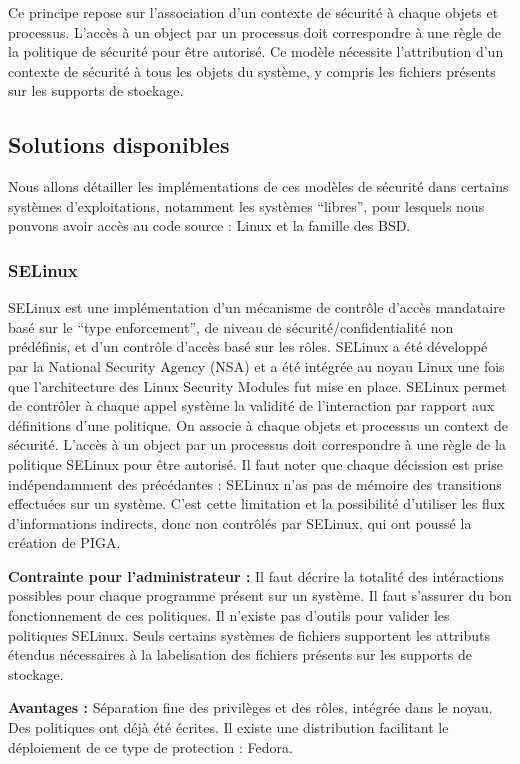 Ce principe repose sur l'association d'un contexte de sécurité à chaque objets et processus. L'accès à un object par un processus doit correspondre à une règle de la politique de sécurité pour être autorisé. Ce modèle nécessite l'attribution d'un contexte de sécurité à tous les objets du système, y compris les fichiers présents sur les supports de stockage.

\subsection{Solutions disponibles}

Nous allons détailler les implémentations de ces modèles de sécurité dans certains systèmes d'exploitations, notamment les systèmes ``libres'', pour lesquels nous pouvons avoir accès au code source : Linux et la famille des BSD.

\subsubsection{SELinux}

SELinux est une implémentation d'un mécanisme de contrôle d'accès mandataire basé sur le ``type enforcement'', de niveau de sécurité/confidentialité non prédéfinis, et d'un contrôle d'accès basé sur les rôles. SELinux a été développé par la National Security Agency (NSA) et a été intégrée au noyau Linux une fois que l'architecture des Linux Security Modules fut mise en place. SELinux permet de contrôler à chaque appel système la validité de l'interaction par rapport aux définitions d'une politique. On associe à chaque objets et processus un context de sécurité. L'accès à un object par un processus doit correspondre à une règle de la politique SELinux pour être autorisé. Il faut noter que chaque décission est prise indépendamment des précédantes : SELinux n'as pas de mémoire des transitions effectuées sur un système. C'est cette limitation et la possibilité d'utiliser les flux d'informations indirects, donc non contrôlés par SELinux, qui ont poussé la création de PIGA.

\begin{list}{}{}
 \item \textbf{Contrainte pour l'administrateur :} Il faut décrire la totalité des intéractions possibles pour chaque programme présent sur un système. Il faut s'assurer du bon fonctionnement de ces politiques. Il n'existe pas d'outils pour valider les politiques SELinux. Seuls certains systèmes de fichiers supportent les attributs étendus nécessaires à la labelisation des fichiers présents sur les supports de stockage.
 \item \textbf{Avantages :} Séparation fine des privilèges et des rôles, intégrée dans le noyau. Des politiques ont déjà été écrites. Il existe une distribution facilitant le déploiement de ce type de protection : Fedora.
\end{list}

